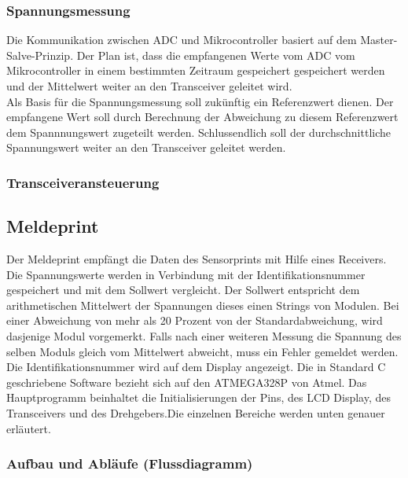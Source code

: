 \subsubsection{Spannungsmessung}
Die Kommunikation zwischen ADC und Mikrocontroller basiert auf dem Master-Salve-Prinzip. Der Plan ist, dass die empfangenen Werte vom ADC vom Mikrocontroller in einem bestimmten Zeitraum gespeichert gespeichert werden und der Mittelwert weiter an den Transceiver geleitet wird.\\
Als Basis für die Spannungsmessung soll zukünftig ein Referenzwert dienen. Der empfangene Wert soll durch Berechnung der Abweichung zu diesem Referenzwert dem Spannnungswert zugeteilt werden. Schlussendlich soll der durchschnittliche Spannungswert weiter an den Transceiver geleitet werden.
\subsubsection{Transceiveransteuerung}
















\newpage
\subsection{Meldeprint}
Der Meldeprint empfängt die Daten des Sensorprints mit Hilfe eines Receivers. Die Spannungswerte werden in Verbindung mit der Identifikationsnummer gespeichert und mit dem Sollwert vergleicht. Der Sollwert entspricht dem arithmetischen Mittelwert der Spannungen dieses einen Strings von Modulen. Bei einer Abweichung von mehr als 20 Prozent von der Standardabweichung, wird dasjenige Modul vorgemerkt. Falls nach einer weiteren Messung die Spannung des selben Moduls gleich vom Mittelwert abweicht, muss ein Fehler gemeldet werden. Die Identifikationsnummer wird auf dem Display angezeigt. Die in Standard C geschriebene Software bezieht sich auf den ATMEGA328P von Atmel. Das Hauptprogramm beinhaltet die Initialisierungen der Pins, des LCD Display, des Transceivers und des Drehgebers.Die einzelnen Bereiche werden unten genauer erläutert.
\subsubsection{Aufbau und Abläufe (Flussdiagramm)}
